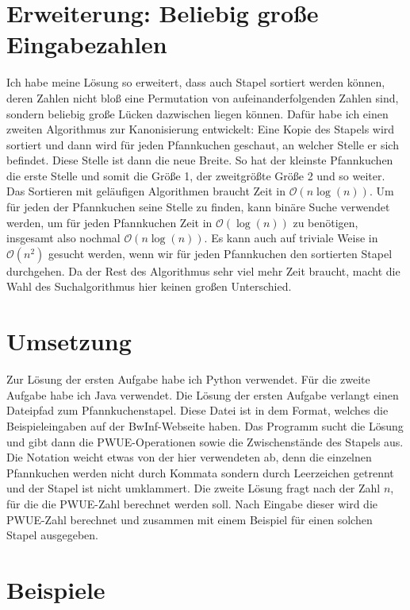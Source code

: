 \documentclass[a4paper,10pt,ngerman]{scrartcl}
\begin{document}
\section{Erweiterung: Beliebig große Eingabezahlen}
Ich habe meine Lösung so erweitert, dass auch Stapel sortiert werden können, deren Zahlen nicht bloß eine Permutation von aufeinanderfolgenden Zahlen sind, sondern beliebig große
Lücken dazwischen liegen können. Dafür habe ich einen zweiten Algorithmus zur Kanonisierung entwickelt: Eine Kopie des Stapels wird sortiert und dann wird für jeden Pfannkuchen
geschaut, an welcher Stelle er sich befindet. Diese Stelle ist dann die neue Breite. So hat der kleinste Pfannkuchen die erste Stelle und somit die Größe 1, der zweitgrößte Größe 2 
und so weiter. Das Sortieren mit geläufigen Algorithmen braucht Zeit in $\mathcal{O}(n \log(n))$. Um für jeden der Pfannkuchen seine Stelle zu finden, kann binäre Suche verwendet werden,
um für jeden Pfannkuchen Zeit in $\mathcal{O}(\log(n))$ zu benötigen, insgesamt also nochmal $\mathcal{O}(n \log(n))$. Es kann auch auf triviale Weise in $\mathcal{O}(n^2)$ gesucht werden,
wenn wir für jeden Pfannkuchen den sortierten Stapel durchgehen. Da der Rest des Algorithmus sehr viel mehr Zeit braucht, macht die Wahl des Suchalgorithmus hier keinen großen Unterschied.
\section{Umsetzung}
Zur Lösung der ersten Aufgabe habe ich Python verwendet. Für die zweite Aufgabe
habe ich Java verwendet. Die Lösung der ersten Aufgabe verlangt einen Dateipfad
zum Pfannkuchenstapel. Diese Datei ist in dem Format, welches die
Beispieleingaben auf der BwInf-Webseite haben. Das Programm sucht die Lösung
und gibt dann die PWUE-Operationen sowie die Zwischenstände des Stapels aus.
Die Notation weicht etwas von der hier verwendeten ab, denn die einzelnen
Pfannkuchen werden nicht durch Kommata sondern durch Leerzeichen getrennt und
der Stapel ist nicht umklammert. Die zweite Lösung fragt nach der Zahl $n$, für die
die PWUE-Zahl berechnet werden soll. Nach Eingabe dieser wird die PWUE-Zahl berechnet
und zusammen mit einem Beispiel für einen solchen Stapel ausgegeben.
\section{Beispiele}
\end{document}
